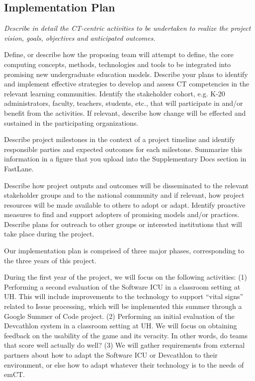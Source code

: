 \subsection{Implementation Plan}

{\em Describe in detail the CT-centric activities to be undertaken to realize the project vision, goals, objectives and anticipated outcomes. 

Define, or describe how the proposing team will attempt to define, the core computing concepts, methods, technologies and tools to be integrated into promising new undergraduate education models.  Describe your plans to identify and implement effective strategies to develop and assess CT competencies in the relevant learning communities.  Identify the stakeholder cohort, e.g. K-20 administrators, faculty, teachers, students, etc., that will participate in and/or benefit from the activities. If relevant, describe how change will be effected and sustained in the participating organizations.  

Describe project milestones in the context of a project timeline and identify responsible parties and expected outcomes for each milestone.  Summarize this information in a figure that you upload into the Supplementary Docs section in FastLane. 

Describe how project outputs and outcomes will be disseminated to the relevant stakeholder groups and to the national community and if relevant, how project resources will be made available to others to adopt or adapt. Identify proactive measures to find and support adopters of promising models and/or practices. Describe plans for outreach to other groups or interested institutions that will take place during the project.  
}

Our implementation plan is comprised of three major phases, corresponding to the three years of this project. 

During the first year of the project, we will focus on the following
activities: (1) Performing a second evaluation of the Software ICU in a
classroom setting at UH.  This will include improvements to the technology
to support ``vital signs'' related to Issue processing, which will be
implemented this summer through a Google Summer of Code project. (2)
Performing an initial evaluation of the Devcathlon system in a classroom
setting at UH.  We will focus on obtaining feedback on the usability of the
game and its veracity. In other words, do teams that score well actually do
well? (3)  We will gather requirements from external partners about how to adapt the Software ICU or Devcathlon to their environment, or else how to adapt whatever their technology is to the needs of emCT. 



